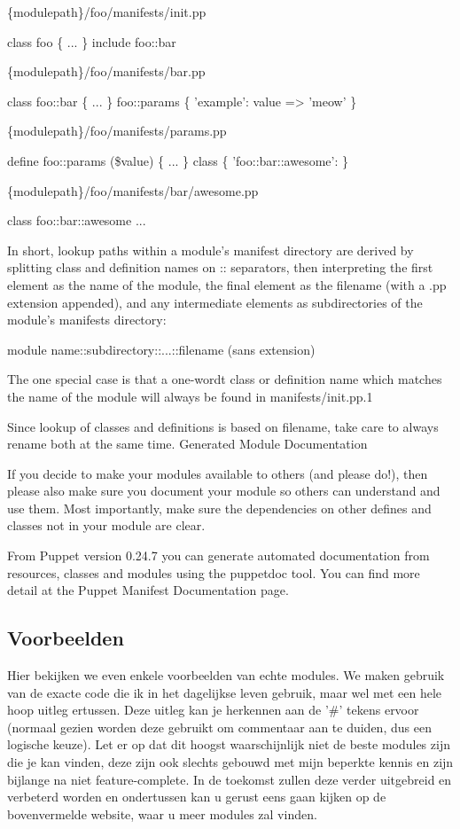 \{modulepath\}/foo/manifests/init.pp

class foo \{ ... \}
include foo::bar 	

\{modulepath\}/foo/manifests/bar.pp

class foo::bar \{ ... \}
foo::params \{ 'example': value => 'meow' \} 	

\{modulepath\}/foo/manifests/params.pp

define foo::params (\$value) \{ ... \}
class \{ 'foo::bar::awesome': \} 	

\{modulepath\}/foo/manifests/bar/awesome.pp

class foo::bar::awesome { ... }

In short, lookup paths within a module's manifest directory are derived by splitting class and definition names on :: separators, then interpreting the first element as the name of the module, the final element as the filename (with a .pp extension appended), and any intermediate elements as subdirectories of the module's manifests directory:

{module name}::{subdirectory}::{...}::{filename (sans extension)}

The one special case is that a one-wordt class or definition name which matches the name of the module will always be found in manifests/init.pp.1

Since lookup of classes and definitions is based on filename, take care to always rename both at the same time.
Generated Module Documentation

If you decide to make your modules available to others (and please do!), then please also make sure you document your module so others can understand and use them. Most importantly, make sure the dependencies on other defines and classes not in your module are clear.

From Puppet version 0.24.7 you can generate automated documentation from resources, classes and modules using the puppetdoc tool. You can find more detail at the Puppet Manifest Documentation page.

\subsection{Voorbeelden}
Hier bekijken we even enkele voorbeelden van echte modules. We maken gebruik van de exacte code die ik in het dagelijkse leven gebruik, maar wel met een hele hoop uitleg ertussen. Deze uitleg kan je herkennen aan de '\#' tekens ervoor (normaal gezien worden deze gebruikt om commentaar aan te duiden, dus een logische keuze). Let er op dat dit hoogst waarschijnlijk niet de beste modules zijn die je kan vinden, deze zijn ook slechts gebouwd met mijn beperkte kennis en zijn bijlange na niet feature-complete. In de toekomst zullen deze verder uitgebreid en verbeterd worden en ondertussen kan u gerust eens gaan kijken op de bovenvermelde website, waar u meer modules zal vinden.

